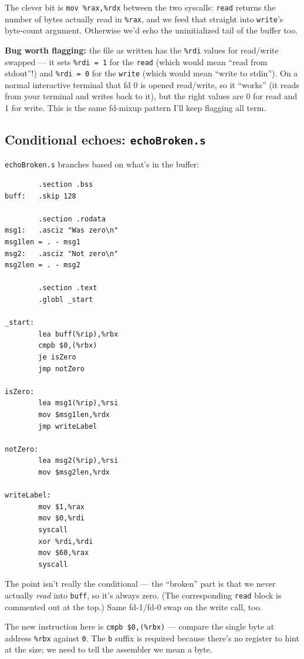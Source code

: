 \documentclass[11pt]{article}
\begin{document}
The clever bit is \texttt{mov \%rax,\%rdx} between the two syscalls:
\texttt{read} returns the number of bytes actually read in
\texttt{\%rax}, and we feed that straight into \texttt{write}'s
byte-count argument. Otherwise we'd echo the uninitialized tail of
the buffer too.

\textbf{Bug worth flagging:} the file as written has the
\texttt{\%rdi} values for read/write swapped --- it sets
\texttt{\%rdi = 1} for the \texttt{read} (which would mean ``read
from stdout''!) and \texttt{\%rdi = 0} for the \texttt{write} (which
would mean ``write to stdin''). On a normal interactive terminal
that fd 0 is opened read/write, so it ``works'' (it reads from your
terminal and writes back to it), but the right values are 0 for
read and 1 for write. This is the same fd-mixup pattern I'll keep
flagging all term.

\subsection*{Conditional echoes: \texttt{echoBroken.s}}

\texttt{echoBroken.s} branches based on what's in the buffer:

\begin{lstlisting}
        .section .bss
buff:   .skip 128

        .section .rodata
msg1:   .asciz "Was zero\n"
msg1len = . - msg1
msg2:   .asciz "Not zero\n"
msg2len = . - msg2

        .section .text
        .globl _start

_start:
        lea buff(%rip),%rbx
        cmpb $0,(%rbx)
        je isZero
        jmp notZero

isZero:
        lea msg1(%rip),%rsi
        mov $msg1len,%rdx
        jmp writeLabel

notZero:
        lea msg2(%rip),%rsi
        mov $msg2len,%rdx

writeLabel:
        mov $1,%rax
        mov $0,%rdi
        syscall
        xor %rdi,%rdi
        mov $60,%rax
        syscall
\end{lstlisting}

The point isn't really the conditional --- the ``broken'' part is
that we never actually \emph{read} into \texttt{buff}, so it's
always zero. (The corresponding \texttt{read} block is commented out
at the top.) Same fd-1/fd-0 swap on the write call, too.

The new instruction here is \texttt{cmpb \$0,(\%rbx)} --- compare the
single byte at address \texttt{\%rbx} against \texttt{0}. The
\texttt{b} suffix is required because there's no register to hint at
the size; we need to tell the assembler we mean a byte.
\end{document}
